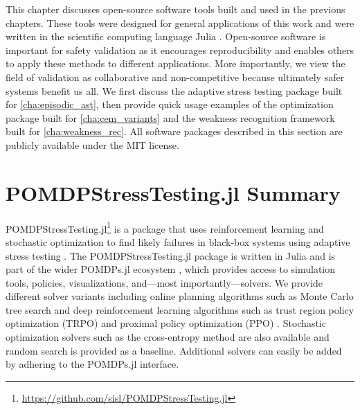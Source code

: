 This chapter discusses open-source software tools built and used in the previous chapters.
These tools were designed for general applications of this work and were written in the scientific computing language Julia \cite{bezanson2017julia}.
Open-source software is important for safety validation as it encourages reproducibility and enables others to apply these methods to different applications.
More importantly, we view the field of validation as collaborative and non-competitive because ultimately safer systems benefit us all.
We first discuss the adaptive stress testing package built for \cref{cha:episodic_ast}, then provide quick usage examples of the optimization package built for \cref{cha:cem_variants} and the weakness recognition framework built for \cref{cha:weakness_rec}. All software packages described in this section are publicly available under the MIT license.


\section{POMDPStressTesting.jl Summary}\label{sec:pomdpstresstesting}
POMDPStressTesting.jl\footnote{\url{https://github.com/sisl/POMDPStressTesting.jl}} is a package that uses reinforcement learning and stochastic optimization to find likely failures in black-box systems using adaptive stress testing \cite{lee2019adaptive}.
The POMDPStressTesting.jl package is written in Julia \cite{bezanson2017julia} and is part of the wider POMDPs.jl ecosystem \cite{pomdps_jl}, which provides access to simulation tools, policies, visualizations, and---most importantly---solvers.
We provide different solver variants including online planning algorithms such as Monte Carlo tree search \cite{coulom2006efficient} and deep reinforcement learning algorithms such as trust region policy optimization (TRPO) \cite{trpo} and proximal policy optimization (PPO) \cite{ppo}.
Stochastic optimization solvers such as the cross-entropy method \cite{rubinstein1999cross} are also available and random search is provided as a baseline.
Additional solvers can easily be added by adhering to the POMDPs.jl interface.


